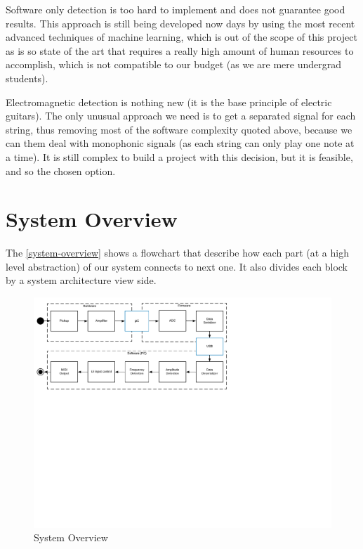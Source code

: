 Software only detection is too hard to implement and does not guarantee good results.
This approach is still being developed now days by using the most recent advanced
techniques of machine learning, which is out of the scope of this project as is so
state of the art that requires a really high amount of human resources to accomplish,
which is not compatible to our budget (as we are mere undergrad students). 

Electromagnetic detection is nothing new (it is the base principle of electric guitars).
The only unusual approach we need is to get a separated signal for each string, thus
removing most of the software complexity quoted above, because we can them deal
with monophonic signals (as each string can only play one note at a time). It is
still complex to build a project with this decision, but it is feasible, and so
the chosen option.

\section{System Overview}
The \autoref{system-overview} shows a flowchart that describe how each part
(at a high level abstraction) of our system connects to next one. It also divides
each block by a system architecture view side.

\begin{figure}[!htpb]
  \centering
  \caption{System Overview}
  \label{system-overview}
  \includegraphics[scale=0.85]{images/system-overview}
\end{figure}